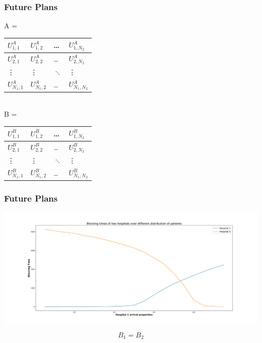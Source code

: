 \begin{frame}
    \frametitle{Future Plans}
    
    \begin{table}[h]
        \centering
        A = 
        \begin{tabular}{|l|l|l|l|}
            \hline
            \( U_{1,1}^A \) & \( U_{1,2}^A \) & \dots & \( U_{1,N_2}^A \) \\ \hline
            \( U_{2,1}^A \) & \( U_{2,2}^A \) & \dots & \( U_{2,N_2}^A \) \\ \hline
            \vdots & \vdots & \( \ddots \) & \vdots \\ \hline
            \( U_{N_1,1}^A \) & \( U_{N_1,2}^A \) & \dots & \( U_{N_1,N_2}^A \) \\ \hline
        \end{tabular}\\
        \vspace{1cm}
        B = 
        \begin{tabular}{|l|l|l|l|}
            \hline
            \( U_{1,1}^B \) & \( U_{1,2}^B \) & \dots & \( U_{1,N_2}^B \) \\ \hline
            \( U_{2,1}^B \) & \( U_{2,2}^B \) & \dots & \( U_{2,N_2}^B \) \\ \hline
            \vdots & \vdots & \( \ddots \) & \vdots \\ \hline
            \( U_{N_1,1}^B \) & \( U_{N_1,2}^B \) & \dots & \( U_{N_1,N_2}^B \) \\ \hline
        \end{tabular}
    \end{table}  
    
\end{frame}


\begin{frame}
    \frametitle{Future Plans}
    
    \centering
    \includegraphics[trim=140 40 150 50, clip, width=\textwidth]{Bin/src/optimal_patient.pdf}

    \begin{equation*}
        B_1 = B_2
    \end{equation*}
\end{frame}


